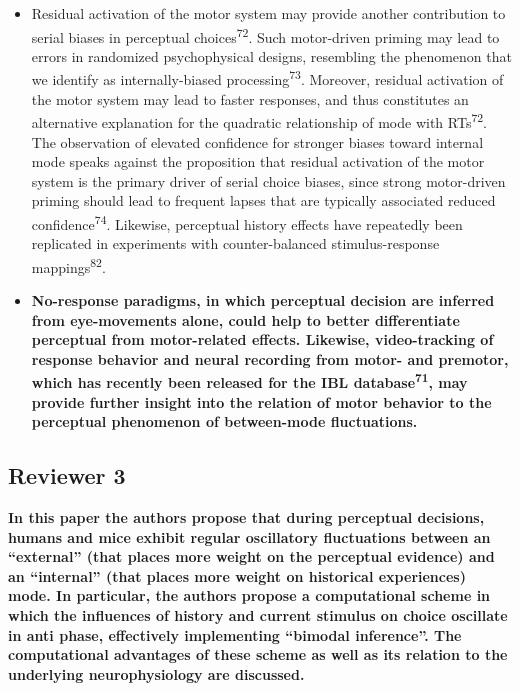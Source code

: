 \documentclass[
]{article}
\begin{document}
\begin{itemize}
\item
  Residual activation of the motor system may provide another
  contribution to serial biases in perceptual
  choices\textsuperscript{72}. Such motor-driven priming may lead to
  errors in randomized psychophysical designs, resembling the phenomenon
  that we identify as internally-biased processing\textsuperscript{73}.
  Moreover, residual activation of the motor system may lead to faster
  responses, and thus constitutes an alternative explanation for the
  quadratic relationship of mode with RTs\textsuperscript{72}. The
  observation of elevated confidence for stronger biases toward internal
  mode speaks against the proposition that residual activation of the
  motor system is the primary driver of serial choice biases, since
  strong motor-driven priming should lead to frequent lapses that are
  typically associated reduced confidence\textsuperscript{74}. Likewise,
  perceptual history effects have repeatedly been replicated in
  experiments with counter-balanced stimulus-response
  mappings\textsuperscript{82}.
\item
  \textbf{No-response paradigms, in which perceptual decision are
  inferred from eye-movements alone, could help to better differentiate
  perceptual from motor-related effects. Likewise, video-tracking of
  response behavior and neural recording from motor- and premotor, which
  has recently been released for the IBL database\textsuperscript{71},
  may provide further insight into the relation of motor behavior to the
  perceptual phenomenon of between-mode fluctuations.}
\end{itemize}

\hypertarget{reviewer-3}{%
\subsection{Reviewer 3}\label{reviewer-3}}

\textbf{In this paper the authors propose that during perceptual
decisions, humans and mice exhibit regular oscillatory fluctuations
between an ``external'' (that places more weight on the perceptual
evidence) and an ``internal'' (that places more weight on historical
experiences) mode. In particular, the authors propose a computational
scheme in which the influences of history and current stimulus on choice
oscillate in anti phase, effectively implementing ``bimodal inference''.
The computational advantages of these scheme as well as its relation to
the underlying neurophysiology are discussed.}
\end{document}
